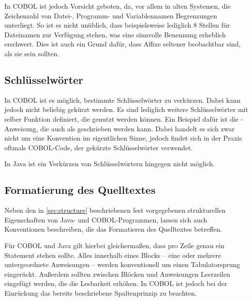 In COBOL ist jedoch Vorsicht geboten, da, vor allem in alten Systemen, die Zeichenzahl von Datei-, Programm- und Variablennamen Begrenzungen unterliegt. So ist es nicht unüblich, dass beispielsweise lediglich 8 Stellen für Dateinamen zur Verfügung stehen, was eine sinnvolle Benennung erheblich erschwert. Dies ist auch ein Grund dafür, dass Affixe seltener beobachtbar sind, als sie sein sollten.

\subsection{Schlüsselwörter}
In COBOL ist es möglich, bestimmte Schlüsselwörter zu verkürzen. Dabei kann jedoch nicht beliebig gekürzt werden. Es sind lediglich weitere Schlüsselwörter mit selber Funktion definiert, die genutzt werden können. Ein Beispiel dafür ist die -Anweisung, die auch als  geschrieben werden kann. Dabei handelt es sich zwar nicht um eine Konvention im eigentlichen Sinne, jedoch findet sich in der Praxis oftmals COBOL-Code, der gekürzte Schlüsselwörter verwendet.

In Java ist ein Verkürzen von Schlüsselwörtern hingegen nicht möglich.

\subsection{Formatierung des Quelltextes}

Neben den in \autoref{sec:structure} beschriebenen fest vorgegebenen strukturellen Eigenschaften von Java- und COBOL-Programmen, lassen sich auch Konventionen beschreiben, die das Formatieren des Quelltextes betreffen.

Für COBOL und Java gilt hierbei gleichermaßen, dass pro Zeile genau ein Statement stehen sollte. Alles innerhalb eines Blocks -- eine oder mehrere untergeordnete Anweisungen -- werden konventionell um einen Tabulatorsprung eingerückt. Außerdem sollten zwischen Blöcken und Anweisungen Leerzeilen eingefügt werden, die die Lesbarkeit erhöhen. In COBOL ist jedoch bei der Einrückung das bereits beschriebene Spaltenprinzip zu beachten.